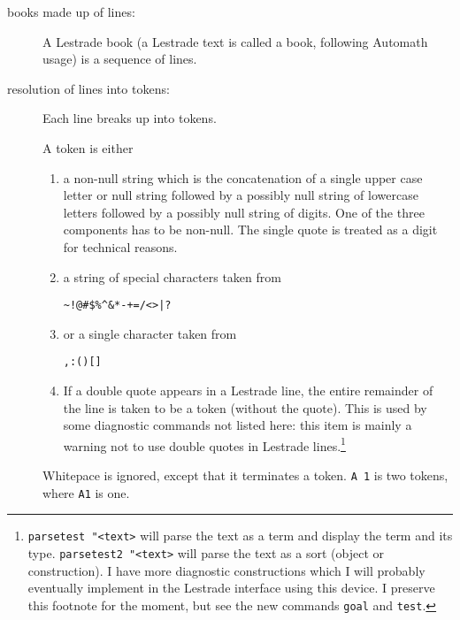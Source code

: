 \documentclass[12pt]{article}
\begin{document}
\begin{description}

\item[books made up of lines:]  A Lestrade book (a Lestrade text is called a book, following Automath usage) is a sequence of lines.

\item[resolution of lines into tokens:]  Each line breaks up into tokens.



A token is either

\begin{enumerate}

\item a non-null string which is the concatenation of a single upper case letter or null string followed by a possibly null string of lowercase letters followed by a possibly null string of digits.
One of the three components has to be non-null.  The single quote is treated as a digit for technical reasons.

\item a string of special characters taken from

     \begin{verbatim}
~!@#$%^&*-+=/<>|?
\end{verbatim}

\item or a single character taken from 

     \begin{verbatim}
,:()[]
\end{verbatim}

\item If a double quote appears in a Lestrade line, the entire remainder of the line is taken to be a token (without the quote).  This is used by some diagnostic commands not listed here:  this item is mainly a warning not to use double quotes in Lestrade lines.\footnote{{\tt parsetest "<text>} will parse the text as a term and display the term and its type.  {\tt parsetest2 "<text>} will parse the text as a sort (object or construction).  I have more diagnostic constructions which I will probably eventually implement in the Lestrade interface using this device.  I preserve this footnote for the moment, but see the new commands {\tt goal} and {\tt test}.}

\end{enumerate}

Whitepace is ignored, except that it terminates a token.  {\tt A 1} is two tokens, where {\tt A1} is one.


\end{description}
\end{document}
